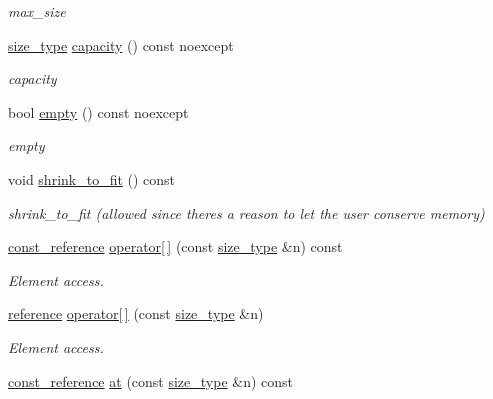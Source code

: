 \begin{DoxyCompactItemize}
\begin{DoxyCompactList}\small\item\em max\+\_\+size \end{DoxyCompactList}\item 
\hyperlink{classIceBRG_1_1element__accessor_aec3d016f3c5e84e7f9248669a9571208}{size\+\_\+type} \hyperlink{classIceBRG_1_1element__accessor_af83ebf16e5c15948dac43776deb205e6}{capacity} () const  noexcept
\begin{DoxyCompactList}\small\item\em capacity \end{DoxyCompactList}\item 
bool \hyperlink{classIceBRG_1_1element__accessor_ac542247120ab0494244604e4748156b1}{empty} () const  noexcept
\begin{DoxyCompactList}\small\item\em empty \end{DoxyCompactList}\item 
void \hyperlink{classIceBRG_1_1element__accessor_a48a19bf110f89d01d5104b3eab0eeda6}{shrink\+\_\+to\+\_\+fit} () const 
\begin{DoxyCompactList}\small\item\em shrink\+\_\+to\+\_\+fit (allowed since there\textquotesingle{}s a reason to let the user conserve memory) \end{DoxyCompactList}\item 
\hyperlink{classIceBRG_1_1element__accessor_aa5a74be2decaa60d9080c4f1b4d3dcb8}{const\+\_\+reference} \hyperlink{classIceBRG_1_1element__accessor_a0b191a649b47afaa129561fcceb135a6}{operator\mbox{[}$\,$\mbox{]}} (const \hyperlink{classIceBRG_1_1element__accessor_aec3d016f3c5e84e7f9248669a9571208}{size\+\_\+type} \&n) const 
\begin{DoxyCompactList}\small\item\em Element access. \end{DoxyCompactList}\item 
\hyperlink{classIceBRG_1_1element__accessor_ae31e9fe4b35d76ed6055052fb788de13}{reference} \hyperlink{classIceBRG_1_1element__accessor_afae05c291dc57fa1c6d9602ca64d497f}{operator\mbox{[}$\,$\mbox{]}} (const \hyperlink{classIceBRG_1_1element__accessor_aec3d016f3c5e84e7f9248669a9571208}{size\+\_\+type} \&n)
\begin{DoxyCompactList}\small\item\em Element access. \end{DoxyCompactList}\item 
\hyperlink{classIceBRG_1_1element__accessor_aa5a74be2decaa60d9080c4f1b4d3dcb8}{const\+\_\+reference} \hyperlink{classIceBRG_1_1element__accessor_a07ec2d2306e072f847d1adab77bf825d}{at} (const \hyperlink{classIceBRG_1_1element__accessor_aec3d016f3c5e84e7f9248669a9571208}{size\+\_\+type} \&n) const 

\end{DoxyCompactItemize}

